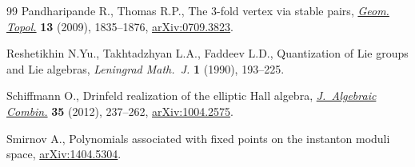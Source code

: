 \documentclass[pdftex]{sigma}%
\numberwithin{equation}{section}
\begin{document}
\begin{thebibliography}{99}
Pandharipande R., Thomas R.P., The 3-fold vertex via stable pairs,
 \href{https://doi.org/10.2140/gt.2009.13.1835}{\textit{Geom. Topol.}} \textbf{13} (2009), 1835--1876, \href{https://arxiv.org/abs/0709.3823}{arXiv:0709.3823}.

Reshetikhin N.{\relax Yu}., Takhtadzhyan L.A., Faddeev L.D., Quantization of
 {L}ie groups and {L}ie algebras, \textit{Leningrad Math.~J.} \textbf{1}
 (1990), 193--225.

Schiffmann O., Drinfeld realization of the elliptic {H}all algebra,
 \href{https://doi.org/10.1007/s10801-011-0302-8}{\textit{J.~Algebraic Combin.}} \textbf{35} (2012), 237--262,
 \href{https://arxiv.org/abs/1004.2575}{arXiv:1004.2575}.

Smirnov A., Polynomials associated with fixed points on the instanton moduli
 space, \href{https://arxiv.org/abs/1404.5304}{arXiv:1404.5304}.

\end{thebibliography}\LastPageEnding
\end{document}
